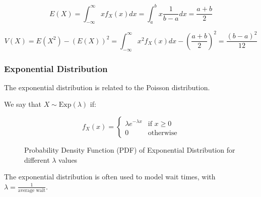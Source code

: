 \documentclass{article}
\begin{document}
    \[
    E(X) = \int_{-\infty}^{\infty} x f_X(x) dx = \int_{a}^{b} x \frac{1}{b-a} dx = \frac{a+b}{2}
    \]
    
    \[
    V(X) = E(X^2) - (E(X))^2 = \int_{-\infty}^{\infty} x^2 f_X(x) dx - (\frac{a+b}{2})^2 = \frac{(b-a)^2}{12}
    \]

    \subsubsection*{Exponential Distribution}

    The exponential distribution is related to the Poisson distribution.

    We say that $X \sim \text{Exp}(\lambda)$ if:

    \[
    f_X(x) = \begin{cases} 
        \lambda e^{-\lambda x} & \text{if } x \geq 0 \\
        0 & \text{otherwise}
    \end{cases}
    \]

    \begin{figure}[h]
        \centering
        \caption{Probability Density Function (PDF) of Exponential Distribution for different $\lambda$ values}
    \end{figure}

    The exponential distribution is often used to model wait times, with $\lambda = \frac{1}{\text{average wait}}$.
\end{document}
